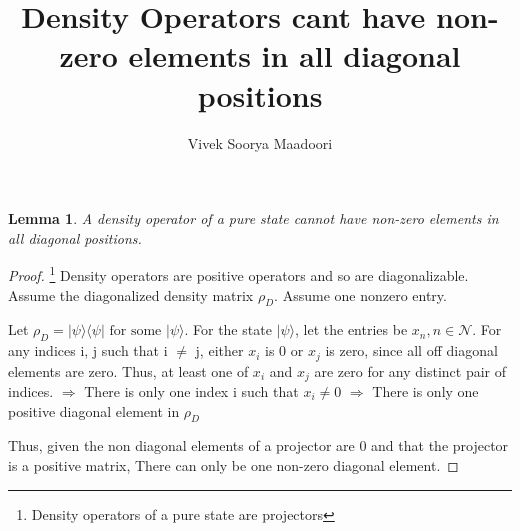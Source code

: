 \documentclass[a4paper,12pt]{amsbook}
\newcommand{\0}{{$|0\rangle$}}
\newcommand{\1}{{$|1\rangle$}}
\newtheorem{lemma}{Lemma}
\begin{document}
\author{Vivek Soorya Maadoori}
\title{Density Operators cant have non-zero elements in all diagonal positions}
\maketitle
\begin{lemma}
A density operator of a pure state cannot have non-zero elements in all diagonal positions.
\end{lemma}
\begin{proof}

    \footnote{Density operators of a pure state are projectors}
    Density operators are positive operators and so are diagonalizable. 
    Assume the diagonalized density matrix $\rho_D$. Assume one nonzero entry. 

    Let $\rho_D = |\psi\rangle\langle\psi| \text{ for some } |\psi\rangle $.
    For the state $|\psi\rangle$, let the entries be $x_n, n \in \mathcal{N}$.
    For any indices i, j such that i $\neq$ j, either $x_i$ is 0 or $x_j$ is zero, since all off diagonal elements are zero. Thus, at least one of $x_i$ and $x_j$ are zero for any distinct pair of indices. 
    $\Rightarrow$ There is only one index i such that $x_i \neq 0$
    $\Rightarrow$ There is only one positive diagonal element in $\rho_D$

    Thus, given the non diagonal elements of a projector are 0 and that the projector is a positive matrix, There can only be one non-zero diagonal element. 
\end{proof}
\end{document}
